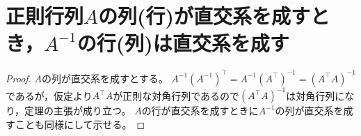     \section{正則行列\texorpdfstring{$A$}{A}の列(行)が直交系を成すとき，\texorpdfstring{$A^{-1}$}{Aの逆行列}の行(列)は直交系を成す}
        \label{行列の列(行)の直交性と逆行列の行(列)の直交性}
        \begin{proof}
            \quad\par
            $A$の列が直交系を成すとする。
            $A^{-1}\left(A^{-1}\right)^\top = A^{-1}\left(A^\top\right)^{-1} = \left(A^\top A\right)^{-1}$であるが，仮定より$A^\top A$が正則な対角行列であるので$\left(A^\top A\right)^{-1}$は対角行列になり，定理の主張が成り立つ。
            $A$の行が直交系を成すときに$A^{-1}$の列が直交系を成すことも同様にして示せる。
        \end{proof}
